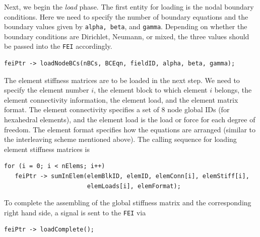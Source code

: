 Next, we begin the {\it load} phase. The first entity for loading is the
nodal boundary conditions. Here we need to specify the number of boundary
equations and the boundary values given by {\tt alpha, beta}, and {\tt gamma}.  Depending on whether the boundary conditions are Dirichlet, Neumann, or mixed,
the three values should be passed into the {\tt FEI} accordingly. 
\begin{display}
\begin{verbatim}
feiPtr -> loadNodeBCs(nBCs, BCEqn, fieldID, alpha, beta, gamma);
\end{verbatim}
\end{display}
The element stiffness matrices are to be loaded in the next step. We need
to specify the element number $i$, the element block to which element $i$
belongs, the element connectivity information, the element load, and the
element matrix format. The element connectivity specifies a set of $8$ node
global IDs (for hexahedral elements), and the element load is the load or
force for each degree of freedom.  The element format specifies how the
equations are arranged (similar to the interleaving scheme mentioned above).
The calling sequence for loading element stiffness matrices is
\begin{display}
\begin{verbatim}
for (i = 0; i < nElems; i++)
   feiPtr -> sumInElem(elemBlkID, elemID, elemConn[i], elemStiff[i],
                       elemLoads[i], elemFormat);
\end{verbatim}
\end{display}
To complete the assembling of the global stiffness matrix and the
corresponding right hand side, a signal is sent to the {\tt FEI} via
\begin{display}
\begin{verbatim}
feiPtr -> loadComplete();
\end{verbatim}
\end{display}


